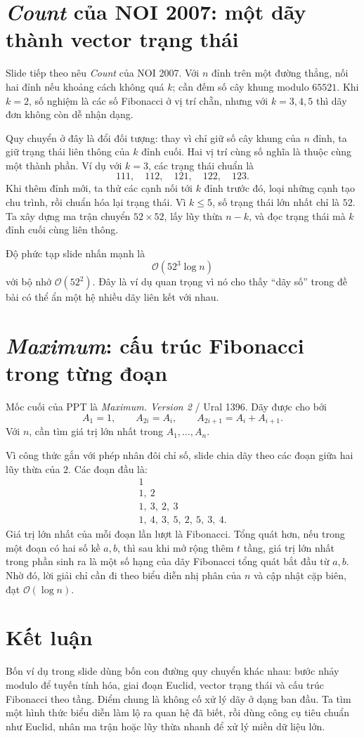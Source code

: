 \documentclass[11pt]{article}
\newcommand{\Oh}{\mathcal{O}}
\begin{document}
\section{\textit{Count} của NOI 2007: một dãy thành vector trạng thái}

Slide tiếp theo nêu \textit{Count} của NOI 2007. Với \(n\) đỉnh trên một đường
thẳng, nối hai đỉnh nếu khoảng cách không quá \(k\); cần đếm số cây khung
modulo \(65521\). Khi \(k=2\), số nghiệm là các số Fibonacci ở vị trí chẵn,
nhưng với \(k=3,4,5\) thì dãy đơn không còn dễ nhận dạng.

Quy chuyển ở đây là đổi đối tượng: thay vì chỉ giữ số cây khung của \(n\) đỉnh,
ta giữ trạng thái liên thông của \(k\) đỉnh cuối. Hai vị trí cùng số nghĩa là
thuộc cùng một thành phần. Ví dụ với \(k=3\), các trạng thái chuẩn là
\[
  111,\quad 112,\quad 121,\quad 122,\quad 123.
\]
Khi thêm đỉnh mới, ta thử các cạnh nối tới \(k\) đỉnh trước đó, loại những
cạnh tạo chu trình, rồi chuẩn hóa lại trạng thái. Vì \(k\le5\), số trạng thái
lớn nhất chỉ là \(52\). Ta xây dựng ma trận chuyển \(52\times52\), lấy lũy
thừa \(n-k\), và đọc trạng thái mà \(k\) đỉnh cuối cùng liên thông.

Độ phức tạp slide nhấn mạnh là
\[
  \Oh(52^3\log n)
\]
với bộ nhớ \(\Oh(52^2)\). Đây là ví dụ quan trọng vì nó cho thấy ``dãy số''
trong đề bài có thể ẩn một hệ nhiều dãy liên kết với nhau.

\section{\textit{Maximum}: cấu trúc Fibonacci trong từng đoạn}

Mốc cuối của PPT là \textit{Maximum. Version 2} / Ural 1396. Dãy được cho bởi
\[
  A_1=1,\qquad A_{2i}=A_i,\qquad A_{2i+1}=A_i+A_{i+1}.
\]
Với \(n\), cần tìm giá trị lớn nhất trong \(A_1,\ldots,A_n\).

Vì công thức gắn với phép nhân đôi chỉ số, slide chia dãy theo các đoạn giữa
hai lũy thừa của \(2\). Các đoạn đầu là:
\[
\begin{array}{l}
1\\
1,\ 2\\
1,\ 3,\ 2,\ 3\\
1,\ 4,\ 3,\ 5,\ 2,\ 5,\ 3,\ 4.
\end{array}
\]
Giá trị lớn nhất của mỗi đoạn lần lượt là Fibonacci. Tổng quát hơn, nếu trong
một đoạn có hai số kề \(a,b\), thì sau khi mở rộng thêm \(t\) tầng, giá trị
lớn nhất trong phần sinh ra là một số hạng của dãy Fibonacci tổng quát bắt
đầu từ \(a,b\). Nhờ đó, lời giải chỉ cần đi theo biểu diễn nhị phân của \(n\)
và cập nhật cặp biên, đạt \(\Oh(\log n)\).

\section{Kết luận}

Bốn ví dụ trong slide dùng bốn con đường quy chuyển khác nhau: bước nhảy
modulo để tuyến tính hóa, giai đoạn Euclid, vector trạng thái và cấu trúc
Fibonacci theo tầng. Điểm chung là không cố xử lý dãy ở dạng ban đầu. Ta tìm
một hình thức biểu diễn làm lộ ra quan hệ đã biết, rồi dùng công cụ tiêu chuẩn
như Euclid, nhân ma trận hoặc lũy thừa nhanh để xử lý miền dữ liệu lớn.
\end{document}
